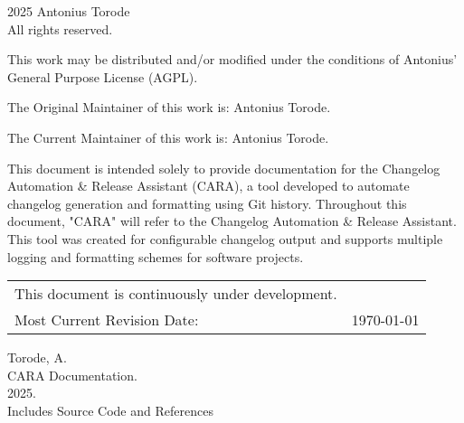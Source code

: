 \pagestyle{empty}
\begingroup
\footnotesize
\parindent 0pt
\parskip \baselineskip
\textcopyright{} 2025 Antonius Torode \\
All rights reserved.

This work may be distributed and/or modified under the conditions of Antonius’ General Purpose License (AGPL).

The Original Maintainer of this work is: Antonius Torode.

The Current Maintainer of this work is: Antonius Torode.

This document is intended solely to provide documentation for the Changelog Automation \& Release Assistant (CARA), a tool developed to automate changelog generation and formatting using Git history. Throughout this document, "CARA" will refer to the Changelog Automation \& Release Assistant. This tool was created for configurable changelog output and supports multiple logging and formatting schemes for software projects.


\begin{center}
\begin{tabular}{ll}
This document is continuously under development. \\
Most Current Revision Date: &  \today 
\end{tabular}
\end{center}

\vfill

Torode, A.\\
\hspace*{1em} CARA Documentation. \\
\hspace*{2em} 2025. \\
\hspace*{2em} Includes Source Code and References \\


\endgroup
\clearpage